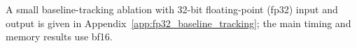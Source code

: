 A small baseline-tracking ablation with 32-bit floating-point (fp32) input and output is given in
Appendix~\ref{app:fp32_baseline_tracking}; the main timing and memory results
use bf16.
